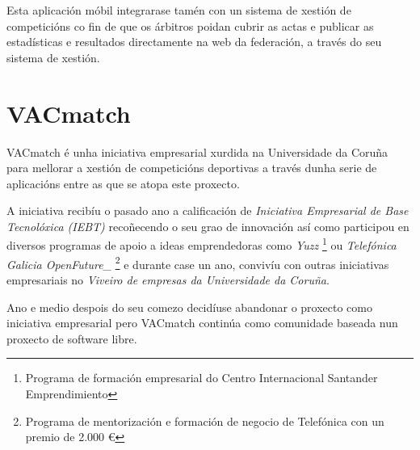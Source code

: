   Esta aplicación móbil integrarase tamén con un sistema de xestión de 
competicións co fin de que os árbitros poidan cubrir as actas e publicar as 
estadísticas e resultados directamente na web da federación, a través do seu 
sistema de xestión.

    \section{VACmatch}

    VACmatch é unha iniciativa empresarial xurdida na Universidade da Coruña para 
mellorar a xestión de competicións deportivas a través dunha serie de 
aplicacións entre as que se atopa este proxecto.

    A iniciativa recibíu o pasado ano a calificación de \emph{Iniciativa Empresarial de 
Base Tecnolóxica (IEBT)} recoñecendo o seu grao de innovación así como participou en 
diversos programas de apoio a ideas emprendedoras como \emph{Yuzz} 
\footnote{Programa de formación empresarial do Centro Internacional Santander 
Emprendimiento} ou \emph{Telefónica Galicia OpenFuture\_} \footnote{Programa de 
mentorización e formación de negocio de Telefónica con un premio de 2.000 
\euro{}} e durante case un ano, convivíu con 
outras iniciativas empresariais no \emph{Viveiro de empresas da Universidade da 
Coruña}.

    Ano e medio despois do seu comezo decidíuse abandonar o proxecto 
como iniciativa empresarial pero VACmatch continúa como comunidade baseada nun 
proxecto de software libre.

